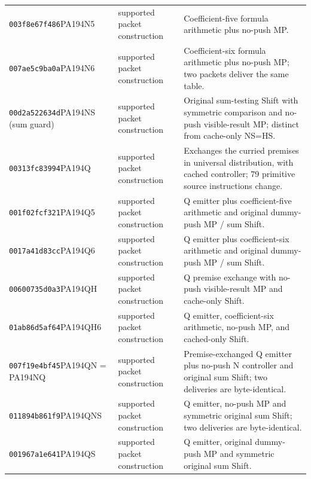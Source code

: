 {\begin{longtable}{@{}>{\raggedright\arraybackslash}p{}>{\raggedright\arraybackslash}p{}>{\raggedright\arraybackslash}p{}@{}}
\texttt{003f8e67f486}\newline PA194N5 & supported packet construction & Coefficient-five formula arithmetic plus no-push MP.\\
\texttt{007ae5c9ba0a}\newline PA194N6 & supported packet construction & Coefficient-six formula arithmetic plus no-push MP; two packets deliver the same table.\\
\texttt{00d2a522634d}\newline PA194NS (sum guard) & supported packet construction & Original sum-testing Shift with symmetric comparison and no-push visible-result MP; distinct from cache-only NS=HS.\\
\texttt{00313fc83994}\newline PA194Q & supported packet construction & Exchanges the curried premises in universal distribution, with cached controller; 79 primitive source instructions change.\\
\texttt{001f02fcf321}\newline PA194Q5 & supported packet construction & Q emitter plus coefficient-five arithmetic and original dummy-push MP / sum Shift.\\
\texttt{0017a41d83cc}\newline PA194Q6 & supported packet construction & Q emitter plus coefficient-six arithmetic and original dummy-push MP / sum Shift.\\
\texttt{00600735d0a3}\newline PA194QH & supported packet construction & Q premise exchange with no-push visible-result MP and cache-only Shift.\\
\texttt{01ab86d5af64}\newline PA194QH6 & supported packet construction & Q emitter, coefficient-six arithmetic, no-push MP, and cached-only Shift.\\
\texttt{007f19e4bf45}\newline PA194QN = PA194NQ & supported packet construction & Premise-exchanged Q emitter plus no-push N controller and original sum Shift; two deliveries are byte-identical.\\
\texttt{011894b861f9}\newline PA194QNS & supported packet construction & Q emitter, no-push MP and symmetric original sum Shift; two deliveries are byte-identical.\\
\texttt{001967a1e641}\newline PA194QS & supported packet construction & Q emitter, original dummy-push MP and symmetric original sum Shift.\\

\end{longtable}}
